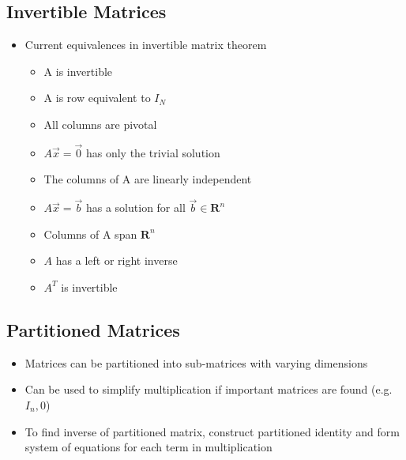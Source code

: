 \documentclass{article}
\begin{document}
\subsection{Invertible Matrices}
\begin{itemize}
    \item Current equivalences in invertible matrix theorem 
    \begin{itemize}
        \item A is invertible
        \item A is row equivalent to \(I_N\)
        \item All columns are pivotal 
        \item \(A\vec{x}=\vec{0}\) has only the trivial solution 
        \item The columns of A are linearly independent 
        \item \(A\vec{x}=\vec{b}\) has a solution for all \(\vec{b}\in \textbf{R}^n\)
        \item Columns of A span \(\textbf{R}^n\)
        \item \(A\) has a left or right inverse 
        \item \(A^T\) is invertible 
    \end{itemize}
\end{itemize}

\subsection{Partitioned Matrices}
\begin{itemize}
    \item Matrices can be partitioned into sub-matrices with varying dimensions 
    \item Can be used to simplify multiplication if important matrices are found (e.g. \(I_n, 0\))
    \item To find inverse of partitioned matrix, construct partitioned identity and form system of equations for each term in multiplication 
\end{itemize}
\end{document}
